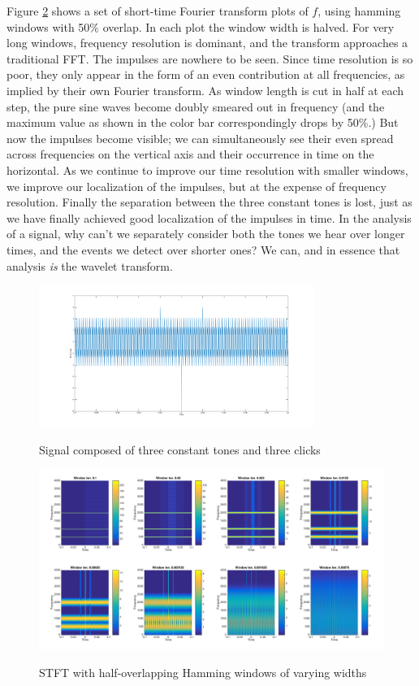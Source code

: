 \documentclass[letterpaper]{article}
\begin{document}
Figure \ref{fig:stft} shows a set of short-time Fourier transform plots of \(f\), using hamming windows with 50\% overlap.
In each plot the window width is halved.
For very long windows, frequency resolution is dominant, and the transform approaches a traditional FFT.
The impulses are nowhere to be seen.
Since time resolution is so poor,
they only appear in the form of an even contribution at all frequencies, as implied by their own Fourier transform.
As window length is cut in half at each step,
the pure sine waves become doubly smeared out in frequency (and the maximum value as shown in the color bar correspondingly drops by 50\%.)
But now the impulses become visible;
we can simultaneously see their even spread across frequencies on the vertical axis and their occurrence in time on the horizontal.
As we continue to improve our time resolution with smaller windows,
we improve our localization of the impulses, but at the expense of frequency resolution.
Finally the separation between the three constant tones is lost,
just as we have finally achieved good localization of the impulses in time.
In the analysis of a signal, why can't we separately consider both the tones we hear over longer times,
and the events we detect over shorter ones?
We can, and in essence that analysis \emph{is} the wavelet transform.
\begin{figure}[h]
  \caption{Signal composed of three constant tones and three clicks}
  \centering
    \includegraphics[width=0.8\textwidth]{figures/clicks}
  \label{fig:clicks}
\end{figure}
\begin{figure}[h]
  \caption{STFT with half-overlapping Hamming windows of varying widths}
  \centering
    \includegraphics[width=1\textwidth]{figures/stft}
  \label{fig:stft}
\end{figure}
\end{document}
